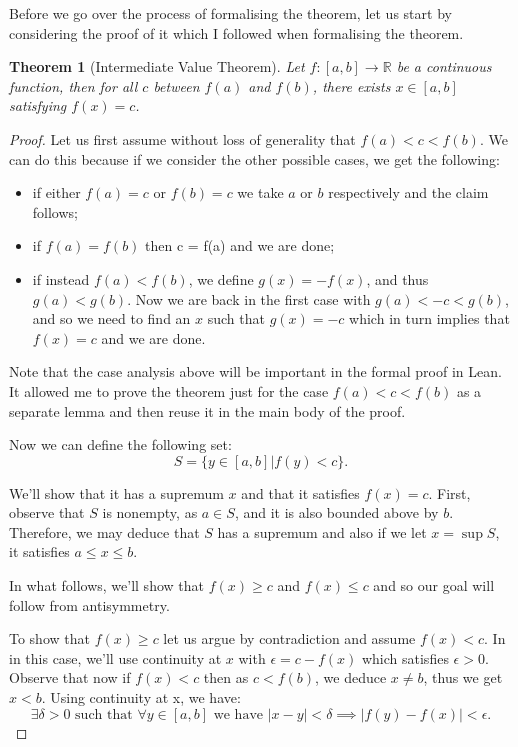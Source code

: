 \documentclass[11pt]{article}
\newcommand\R{\mathbb{R}}
\newcommand\sucht{\text{ such that }}
\newcommand\weh{\text{ we have }}
\newtheorem*{theorem}{Theorem}
\begin{document}
Before we go over the process of formalising the theorem, let us start by
considering the proof of it which I followed when formalising the theorem.
\begin{theorem}[Intermediate Value Theorem]
  Let $f : [a, b] \to \R  $ be a continuous function, then for all $c$ between
  $f(a)$ and $f(b)$, there exists $x \in [a, b] $ satisfying $f(x) = c$.
\end{theorem}

\begin{proof}
  Let us first assume without loss of generality that $f(a) < c < f(b)$. We can
  do this because if we consider the other possible cases, we get the following:
  \begin{itemize}
    \item if either $f(a) = c$ or $f(b) = c$ we take $a$ or $b$ respectively
      and the claim follows;
    \item if $f(a) = f(b)$ then c = f(a) and we are done;
    \item if instead $f(a) < f(b)$, we define $g(x) = -f(x)$, and thus
      $g(a) < g(b)$. Now we are back in the first case with $g(a) < -c < g(b)$,
      and so we need to find an $x$ such that $g(x) = - c$ which in turn implies
      that $f(x) = c$ and we are done.
  \end{itemize}

Note that the case analysis above will be important in the formal proof in
Lean. It allowed me to prove the theorem just for the case $f(a) < c < f(b)$ as
a separate lemma and then reuse it in the main body of the proof.

Now we can define the following set:
\[
  S = \lbrace y \in [a, b] | f(y) < c\rbrace
.\]

We'll show that it has a supremum $x$ and that it satisfies $f(x) = c$. First,
observe that $S$ is nonempty, as $ a \in S $, and it is also bounded above by
$b$. Therefore, we may deduce that $S$ has a supremum and also if we let
$x = \sup S$, it satisfies $a \le x \le b$.

In what follows, we'll show that $f(x) \ge c$ and  $f(x) \le c$ and so our goal
will follow from antisymmetry.

To show that $f(x) \ge c$ let us argue by contradiction and assume $f(x) < c$.
In in this case, we'll use continuity at  $x$ with  $\epsilon = c - f(x) $
which satisfies  $\epsilon > 0$. Observe that now if $f(x) < c$ then as $c <
f(b)$, we deduce  $x \ne b$, thus we get  $x < b$. Using continuity at x, we have:
\[
\exists \delta > 0 \sucht \forall y \in [a, b] \weh | x - y | < \delta \implies |f(y) - f(x)| < \epsilon .\]


\end{proof}
\end{document}
